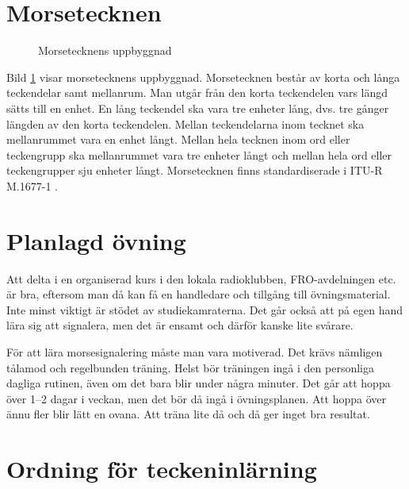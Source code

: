 \section{Morsetecknen}

\begin{figure}
  \caption{Morsetecknens uppbyggnad}
  \label{fig:bild_morse_1}
\end{figure}

Bild \ref{fig:bild_morse_1} visar morsetecknens uppbyggnad.
Morsetecknen består av korta och långa teckendelar samt mellanrum.
Man utgår från den korta teckendelen vars längd sätts till en enhet.
En lång teckendel ska vara tre enheter lång, dvs. tre gånger längden av den
korta teckendelen.
Mellan teckendelarna inom tecknet ska mellanrummet vara en enhet långt.
Mellan hela tecknen inom ord eller teckengrupp ska mellanrummet vara
tre enheter långt och mellan hela ord eller teckengrupper sju enheter långt.
Morsetecknen finns standardiserade i ITU-R M.1677-1 \cite{M1677-1}.

\section{Planlagd övning}

Att delta i en organiserad kurs i den lokala radioklubben, FRO-avdelningen etc.
är bra, eftersom man då kan få en handledare och tillgång till övningsmaterial.
Inte minst viktigt är stödet av studiekamraterna.
Det går också att på egen hand lära sig att signalera, men det är ensamt och
därför kanske lite svårare.

För att lära morsesignalering måste man vara motiverad.
Det krävs nämligen tålamod och regelbunden träning.
Helst bör träningen ingå i den personliga dagliga rutinen, även om det bara
blir under några minuter.
Det går att hoppa över 1--2 dagar i veckan, men det bör då ingå i övningsplanen.
Att hoppa över ännu fler blir lätt en ovana.
Att träna lite då och då ger inget bra resultat.

\section[Inlärningsordning]{Ordning för teckeninlärning}

